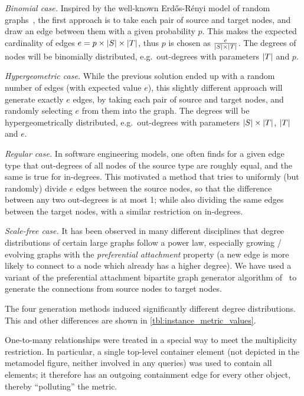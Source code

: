   \emph{Binomial case.} Inspired by the well-known Erdős-Rényi model of random
  graphs~\cite{erdos1960erg}, the first approach is to take each pair of source and
  target nodes, and draw an edge between them with a given probability $p$. This makes the
  expected cardinality of edges $e = p \times |{S}| \times |{T}|$, thus $p$
  is chosen as $\frac{e}{|{S}| \times |{T}|}$. The degrees of nodes will be
  binomially distributed, e.g.\ out-degrees with parameters $|{T}|$ and $p$.
  
  \emph{Hypergeometric case.} While the previous solution ended up with a
  random number of edges (with expected value $e$), this slightly different
  approach will generate exactly $e$ edges, by taking each pair of source and
  target nodes, and randomly selecting $e$ from them into the graph. The degrees
  will be hypergeometrically distributed, e.g.\ out-degrees with parameters
  $|{S}| \times |{T}|$, $|{T}|$ and $e$.
    
  \emph{Regular case.} In software engineering models, one often finds for a
  given edge type that out-degrees of all nodes of the source type are roughly
  equal, and the same is true for in-degrees. This motivated a method that tries
  to uniformly (but randomly) divide $e$ edges between the source nodes, so that
  the difference between any two out-degrees is at most 1; while also dividing
  the same edges between the target nodes, with a similar restriction on
  in-degrees.
  
  \emph{Scale-free case.} It has been observed in many different disciplines
  that degree distributions of certain large graphs follow a power law,
  especially growing / evolving graphs with the \emph{preferential attachment}
  property (a new edge is more likely to connect to a node which already has a
  higher degree). We have used a variant of the preferential attachment
  bipartite graph generator algorithm of~\cite{RandomNetworkGeneration2005} to
  generate the connections from source nodes to target nodes.
 
The four generation methods induced significantly different degree
distributions. 
This and other differences are shown in \autoref{tbl:instance_metric_values}.
 
One-to-many relationships were treated in a special way to meet the multiplicity
restriction. In particular, a single top-level container element (not depicted
in the metamodel figure, neither involved in any queries) was used to contain
all elements; it therefore has an outgoing containment edge for every other
object, thereby ``polluting'' the  metric.


